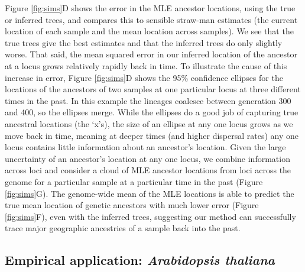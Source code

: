 \documentclass[12pt]{article}
\begin{document}
Figure \ref{fig:sims}D shows the error in the MLE ancestor locations, using the true or inferred trees, and compares this to sensible straw-man estimates (the current location of each sample and the mean location across samples).
We see that the true trees give the best estimates and that the inferred trees do only slightly worse. 
That said, the mean squared error in our inferred location of the ancestor at a locus grows relatively rapidly back in time.
To illustrate the cause of this increase in error, Figure \ref{fig:sims}D shows the 95\% confidence ellipses for the locations of the ancestors of two samples at one particular locus at three different times in the past.
In this example the lineages coalesce between generation 300 and 400, so the ellipses merge.
While the ellipses do a good job of capturing true ancestral locations (the `x's), the size of an ellipse at any one locus grows as we move back in time, 
meaning at deeper times (and higher dispersal rates) any one locus contains little information about an ancestor's location.
Given the large uncertainty of an ancestor's location at any one locus, we combine information across loci and consider a cloud of MLE ancestor locations from loci across the genome for a particular sample at a particular time in the past (Figure \ref{fig:sims}G).
The genome-wide mean of the MLE locations is able to predict the true mean location of genetic ancestors with much lower error (Figure \ref{fig:sims}F), even with the inferred trees, suggesting our method can successfully trace major geographic ancestries of a sample back into the past.

\subsection*{Empirical application: \textit{Arabidopsis thaliana}}
\end{document}
